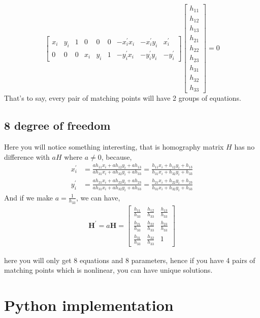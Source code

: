 \documentclass[12pt, a4 paper]{article}
\begin{document}
\begin{equation}
    \begin{bmatrix}
        x_{i} & y_{i} & 1 & 0 & 0 & 0 & -x_{i}^{\prime}x_{i} 
        & -x_{i}^{\prime}y_{i} & x_{i}^{\prime}\\
        0 & 0 & 0 & x_{i} & y_{i} & 1 & -y_{i}^{\prime}x_{i} &
        -y_{i}^{\prime}y_{i} & -y_{i}^{\prime}
    \end{bmatrix}
    \begin{bmatrix}
        h_{11} \\ h_{12} \\h_{13}\\h_{21}\\h_{22}\\h_{23}\\
        h_{31}\\h_{32}\\h_{33}
    \end{bmatrix} = 0
\end{equation}
\indent That's to say, every pair of matching points will have
2 groups of equations.

\subsection{8 degree of freedom}
Here you will notice something interesting, that is homography
matrix $H$ has no difference with $aH$ where $a\neq 0$, because,
\begin{align}
    x_{i}^{\prime} &= \frac{ah_{11}x_{i} + ah_{12}y_{i} + ah_{13}}
    {ah_{31}x_{i} + ah_{32}y_{i} + ah_{33}} = 
    \frac{h_{11}x_{i} + h_{12}y_{i} + h_{13}}
    {h_{31}x_{i} + h_{32}y_{i} + h_{33}}\\
    y_{i}^{\prime} &= \frac{ah_{21}x_{i} + ah_{22}y_{i} + ah_{23}}
    {ah_{31}x_{i} + ah_{32}y_{i} + ah_{33}} =
    \frac{h_{21}x_{i} + h_{22}y_{i} + h_{23}}
    {h_{31}x_{i} + h_{32}y_{i} + h_{33}}
\end{align}
\indent And if we make $a=\frac{1}{h_{33}}$, we can have,
\setlength{\arraycolsep}{3.0pt}
\renewcommand{\arraystretch}{1.5}
\begin{equation}
    \begin{array}{lc}
        \boldsymbol{H}^{\prime} = a\boldsymbol{H} = 
        \begin{bmatrix}
            \frac{h_{11}}{h_{33}} & \frac{h_{12}}{h_{33}} & \frac{h_{13}}{h_{33}}\\
            \frac{h_{21}}{h_{33}} & \frac{h_{22}}{h_{33}} & \frac{h_{23}}{h_{33}}\\
            \frac{h_{31}}{h_{33}} & \frac{h_{32}}{h_{33}} & 1
        \end{bmatrix}
    \end{array}
\end{equation}

\indent here you will only get 8 equations and 8 parameters, hence
if you have 4 pairs of matching points which is nonlinear, you can
have unique solutions.

\section{Python implementation}
\end{document}

